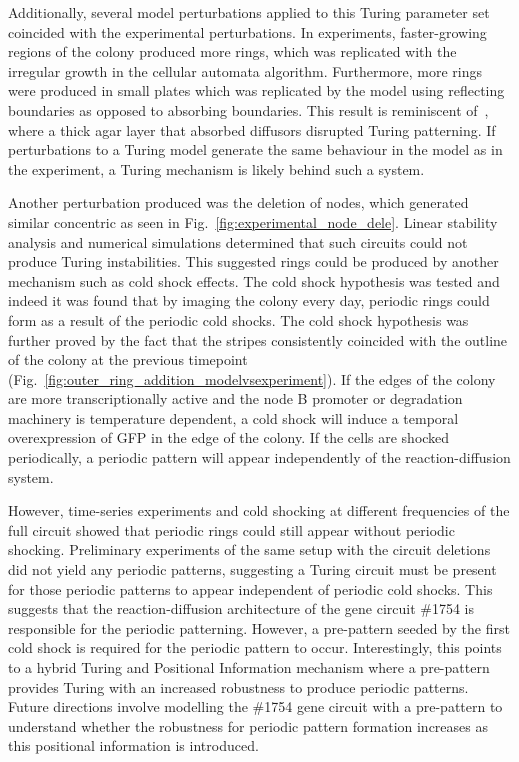 Additionally, several model perturbations applied to this Turing parameter set coincided with the experimental perturbations.
In experiments, faster-growing regions of the colony produced more rings, which was replicated with the irregular growth in the cellular automata algorithm.
Furthermore, more rings were produced in small plates which was replicated by the model using reflecting boundaries as opposed to absorbing boundaries.
This result is reminiscent of~\cite{Krause2020}, where a thick agar layer that absorbed diffusors disrupted Turing patterning.
If perturbations to a Turing model generate the same behaviour in the model as in the experiment, a Turing mechanism is likely behind such a system.

Another perturbation produced was the deletion of nodes, which generated similar concentric as seen in Fig.~\ref{fig:experimental_node_dele}.
Linear stability analysis and numerical simulations determined that such circuits could not produce Turing instabilities.
This suggested rings could be produced by another mechanism such as cold shock effects.
The cold shock hypothesis was tested and indeed it was found that by imaging the colony every day, periodic rings could form as a result of the periodic cold shocks.
The cold shock hypothesis was further proved by the fact that the stripes consistently coincided with the outline of the colony at the previous timepoint (Fig.~\ref{fig:outer_ring_addition_modelvsexperiment}).
If the edges of the colony are more transcriptionally active and the node B promoter or degradation machinery is temperature dependent, a cold shock will induce a temporal overexpression of GFP in the edge of the colony.
If the cells are shocked periodically, a periodic pattern will appear independently of the reaction-diffusion system.

However, time-series experiments and cold shocking at different frequencies of the full circuit showed that periodic rings could still appear without periodic shocking.
Preliminary experiments of the same setup with the circuit deletions did not yield any periodic patterns, suggesting a Turing circuit must be present for those periodic patterns to appear independent of periodic cold shocks.
This suggests that the reaction-diffusion architecture of the gene circuit \#1754 is responsible for the periodic patterning.
However, a pre-pattern seeded by the first cold shock is required for the periodic pattern to occur.
Interestingly, this points to a hybrid Turing and Positional Information mechanism where a pre-pattern provides Turing with an increased robustness to produce periodic patterns.
Future directions involve modelling the \#1754 gene circuit with a pre-pattern to understand whether the robustness for periodic pattern formation increases as this positional information is introduced.

